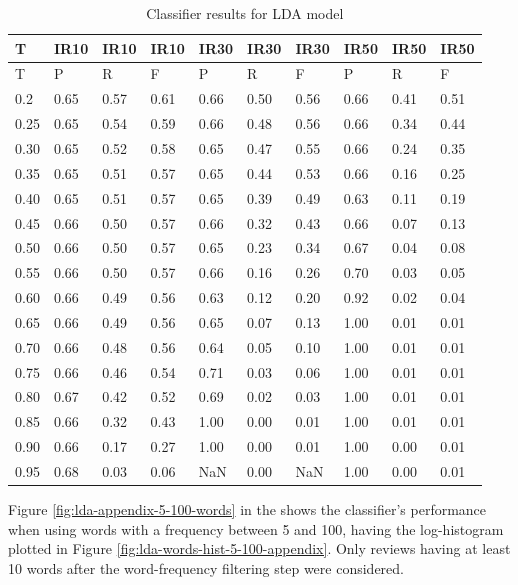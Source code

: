 \begin{center}
\begin{table}[!h]
\centering
\begin{tabular}{|l|l|l|l|l|l|l|l|l|l|}
  \hline
T & IR10 & IR10 & IR10 & IR30 & IR30 & IR30 & IR50 & IR50 & IR50 \\ 
  \hline
T & P & R & F & P & R & F & P & R & F \\ 
   \hline
0.2 & 0.65 & 0.57 & 0.61 & 0.66 & 0.50 & 0.56 & 0.66 & 0.41 & 0.51 \\ 
  0.25 & 0.65 & 0.54 & 0.59 & 0.66 & 0.48 & 0.56 & 0.66 & 0.34 & 0.44 \\ 
  0.30 & 0.65 & 0.52 & 0.58 & 0.65 & 0.47 & 0.55 & 0.66 & 0.24 & 0.35 \\ 
  0.35 & 0.65 & 0.51 & 0.57 & 0.65 & 0.44 & 0.53 & 0.66 & 0.16 & 0.25 \\ 
  0.40 & 0.65 & 0.51 & 0.57 & 0.65 & 0.39 & 0.49 & 0.63 & 0.11 & 0.19 \\ 
  0.45 & 0.66 & 0.50 & 0.57 & 0.66 & 0.32 & 0.43 & 0.66 & 0.07 & 0.13 \\ 
  0.50 & 0.66 & 0.50 & 0.57 & 0.65 & 0.23 & 0.34 & 0.67 & 0.04 & 0.08 \\ 
  0.55 & 0.66 & 0.50 & 0.57 & 0.66 & 0.16 & 0.26 & 0.70 & 0.03 & 0.05 \\ 
  0.60 & 0.66 & 0.49 & 0.56 & 0.63 & 0.12 & 0.20 & 0.92 & 0.02 & 0.04 \\ 
  0.65 & 0.66 & 0.49 & 0.56 & 0.65 & 0.07 & 0.13 & 1.00 & 0.01 & 0.01 \\ 
   \rowcolor[gray]{.7} 0.70 & 0.66 & 0.48 & 0.56 & 0.64 & 0.05 & 0.10 & 1.00 & 0.01 & 0.01 \\ 
  0.75 & 0.66 & 0.46 & 0.54 & 0.71 & 0.03 & 0.06 & 1.00 & 0.01 & 0.01 \\ 
   \rowcolor[gray]{.7} 0.80 & 0.67 & 0.42 & 0.52 & 0.69 & 0.02 & 0.03 & 1.00 & 0.01 & 0.01 \\ 
  0.85 & 0.66 & 0.32 & 0.43 & 1.00 & 0.00 & 0.01 & 1.00 & 0.01 & 0.01 \\ 
  0.90 & 0.66 & 0.17 & 0.27 & 1.00 & 0.00 & 0.01 & 1.00 & 0.00 & 0.01 \\ 
  0.95 & 0.68 & 0.03 & 0.06 & NaN & 0.00 & NaN & 1.00 & 0.00 & 0.01 \\ 
   \hline
\end{tabular}
\caption{Classifier results for LDA model} 
\label{tab:lda}
\end{table}\end{center}

Figure \ref{fig:lda-appendix-5-100-words} in the  shows the classifier's performance when using words with a frequency between 5 and 100, having the log-histogram plotted in Figure \ref{fig:lda-words-hist-5-100-appendix}. Only reviews having at least 10 words after the word-frequency filtering step were considered. 
